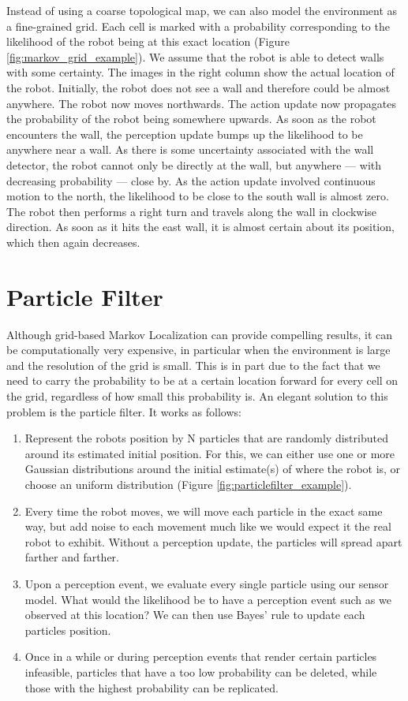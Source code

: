 Instead of using a coarse topological map, we can also model the environment as a fine-grained grid. Each cell is marked with a probability corresponding to the likelihood of the robot being at this exact location (Figure \ref{fig:markov_grid_example}). We assume that the robot is able to detect walls with some certainty. The images in the right column show the actual location of the robot. Initially, the robot does not see a wall and therefore could be almost anywhere. The robot now moves northwards. The action update now propagates the probability of the robot being somewhere upwards. As soon as the robot encounters the wall, the perception update bumps up the likelihood to be anywhere near a wall. As there is some uncertainty associated with the wall detector, the robot cannot only be directly at the wall, but anywhere --- with decreasing probability --- close by. As the action update involved continuous motion to the north, the likelihood to be close to the south wall is almost zero. The robot then performs a right turn and travels along the wall in clockwise direction. As soon as it hits the east wall, it is almost certain about its position, which then again decreases.

\section{Particle Filter}
Although grid-based Markov Localization can provide compelling results, it can be computationally very expensive, in particular when the environment is large and the resolution of the grid is small. This is in part due to the fact that we need to carry the probability to be at a certain location forward for every cell on the grid, regardless of how small this probability is. An elegant solution to this problem is the particle filter. It works as follows:
\begin{enumerate}
\item Represent the robots position by N particles that are randomly distributed around its estimated initial position. For this, we can either use one or more Gaussian distributions around the initial estimate(s) of where the robot is, or choose an uniform distribution (Figure \ref{fig:particlefilter_example}).
\item Every time the robot moves, we will move each particle in the exact same way, but add noise to each movement much like we would expect it the real robot to exhibit. Without a perception update, the particles will spread apart farther and farther.
\item Upon a perception event, we evaluate every single particle using our sensor model. What would the likelihood be to have a perception event such as we observed at this location? We can then use Bayes' rule to update each particles position.
\item Once in a while or during perception events that render certain particles infeasible, particles that have a too low probability can be deleted, while those with the highest probability can be replicated.
\end{enumerate}

